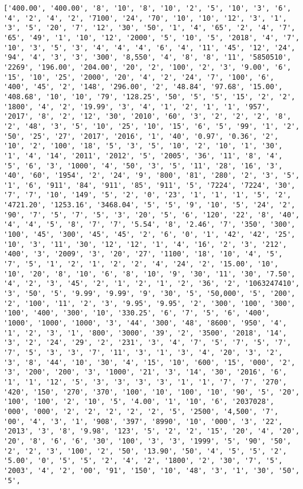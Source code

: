 \documentclass[11pt]{article}
\begin{document}
\begin{Verbatim}[commandchars=\\\{\}]
['400.00', '400.00', '8', '10', '8', '10', '2', '5', '10', '3', '6', '4', '2', '4', '2', '7100', '24', '70', '10', '10', '12', '3', '1', '3', '5', '20', '7', '12', '30', '50', '1', '4', '65', '2', '4', '7', '65', '49', '1', '10', '12', '2000', '5', '10', '5', '2018', '4', '7', '10', '3', '5', '3', '4', '4', '4', '6', '4', '11', '45', '12', '24', '94', '4', '3', '3', '300', '8,550', '4', '8', '8', '11', '5850510', '2269', '196.00', '204.00', '20', '2', '100', '2', '3', '9.00', '6', '15', '10', '25', '2000', '20', '4', '2', '24', '7', '100', '6', '400', '45', '2', '148', '296.00', '2', '48.84', '97.68', '15.00', '408.68', '10', '10', '79', '128.25', '50', '5', '5', '15', '2', '2', '1800', '4', '2', '19.99', '3', '4', '1', '2', '1', '1', '957', '2017', '8', '2', '12', '30', '2010', '60', '3', '2', '2', '2', '8', '2', '48', '3', '5', '10', '25', '10', '15', '6', '5', '99', '1', '2', '50', '25', '27', '2017', '2016', '1', '40', '0.97', '0.36', '2', '10', '2', '100', '18', '5', '3', '5', '10', '2', '10', '1', '30', '1', '4', '14', '2011', '2012', '5', '2005', '36', '11', '8', '4', '5', '6', '3', '1000', '4', '50', '3', '5', '11', '28', '16', '3', '40', '60', '1954', '2', '24', '9', '800', '81', '280', '2', '3', '5', '1', '6', '911', '84', '911', '85', '911', '5', '7224', '7224', '30', '7', '7', '10', '149', '5', '2', '0', '23', '1', '1', '1', '5', '2', '4721.20', '1253.16', '3468.04', '5', '5', '9', '10', '5', '24', '2', '90', '7', '5', '7', '5', '3', '20', '5', '6', '120', '22', '8', '40', '4', '4', '5', '8', '7', '7', '5.54', '8', '2.46', '7', '350', '300', '100', '45', '300', '45', '45', '2', '6', '0', '1', '42', '42', '25', '10', '3', '11', '30', '12', '12', '1', '4', '16', '2', '3', '212', '400', '3', '2009', '3', '20', '27', '1100', '18', '10', '4', '5', '7', '5', '1', '2', '1', '2', '2', '4', '24', '2', '15.00', '10', '10', '20', '8', '10', '6', '8', '10', '9', '30', '11', '30', '7.50', '4', '2', '3', '45', '2', '1', '2', '1', '2', '36', '2', '1063247410', '3', '50', '5', '9.99', '9.99', '9', '30', '5', '50,000', '5', '200', '2', '100', '11', '2', '3', '9.95', '9.95', '2', '300', '100', '300', '100', '400', '300', '10', '330.25', '6', '7', '5', '6', '400', '1000', '1000', '1000', '3', '44', '300', '48', '8600', '950', '4', '1', '2', '3', '1', '800', '3000', '39', '2', '3500', '2018', '14', '3', '2', '24', '29', '2', '231', '3', '4', '7', '5', '7', '5', '7', '7', '5', '3', '3', '7', '11', '3', '1', '3', '4', '20', '3', '2', '3', '8', '44', '10', '30', '4', '15', '10', '600', '15', '000', '2', '3', '200', '200', '3', '1000', '21', '3', '14', '30', '2016', '6', '1', '1', '12', '5', '3', '3', '3', '3', '1', '1', '7', '7', '270', '420', '150', '270', '370', '100', '10', '100', '10', '90', '5', '20', '100', '100', '2', '10', '5', '4.00', '1', '10', '6', '2037028', '000', '000', '2', '2', '2', '2', '2', '5', '2500', '4,500', '7', '00', '4', '3', '1', '908', '397', '8990', '10', '000', '3', '22', '2013', '3', '8', '9.98', '123', '5', '2', '2', '15', '20', '4', '20', '20', '8', '6', '6', '30', '100', '3', '3', '1999', '5', '90', '50', '2', '2', '3', '100', '2', '50', '13.90', '50', '4', '5', '5', '2', '5.00', '0', '5', '5', '2', '4', '2', '1800', '2', '30', '7', '5', '2003', '4', '2', '00', '91', '150', '10', '48', '3', '1', '30', '50', '5', 
\end{Verbatim}
\end{document}

